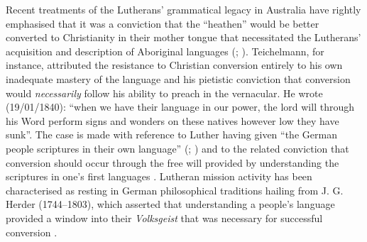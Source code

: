 Recent treatments of the Lutherans’ grammatical legacy in Australia have rightly emphasised that it was a conviction that the “heathen” would be better converted to Christianity in their mother tongue that necessitated the Lutherans’ acquisition and description of Aboriginal languages (\citealt[9]{graetz_open_1988}; \citealt[87]{kenny_arandas_2013}). Teichelmann, for instance, attributed the resistance to Christian conversion entirely to his own inadequate mastery of the language and his pietistic conviction that conversion would \textit{necessarily} follow his ability to preach in the vernacular. He wrote (19/01/1840): “when we have their language in our power, the lord will through his Word perform signs and wonders on these natives however low they have sunk”. The case is made with reference to Luther having given “the German people scriptures in their own language” (\citealt[9]{graetz_open_1988}; \citealt[523--527]{hill_broken_2002}) and to the related conviction that conversion should occur through the free will provided by understanding the scriptures in one’s first languages \citep[87]{kenny_arandas_2013}. Lutheran mission activity has been characterised as resting in German philosophical traditions hailing from J. G. Herder (1744--1803), which asserted that understanding a people’s language provided a window into their \textit{Volksgeist} that was necessary for successful conversion \citep[99]{kenny_arandas_2013}. 

